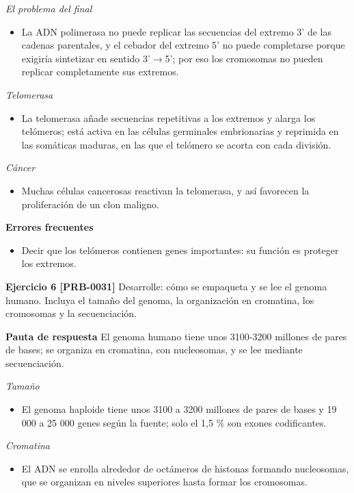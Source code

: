 \documentclass{book}
\begin{document}
\noindent\textit{El problema del final}
\begin{itemize}
\item La ADN polimerasa no puede replicar las secuencias del extremo 3' de las cadenas parentales, y el cebador del extremo 5' no puede completarse porque exigiría sintetizar en sentido 3'\(\to\)5'; por eso los cromosomas no pueden replicar completamente sus extremos.
\end{itemize}

\noindent\textit{Telomerasa}
\begin{itemize}
\item La telomerasa añade secuencias repetitivas a los extremos y alarga los telómeros; está activa en las células germinales embrionarias y reprimida en las somáticas maduras, en las que el telómero se acorta con cada división.
\end{itemize}

\noindent\textit{Cáncer}
\begin{itemize}
\item Muchas células cancerosas reactivan la telomerasa, y así favorecen la proliferación de un clon maligno.
\end{itemize}

\noindent\textbf{Errores frecuentes}
\begin{itemize}
\item Decir que los telómeros contienen genes importantes: su función es proteger los extremos.
\end{itemize}

\noindent\textbf{Ejercicio 6 [PRB-0031]}
Desarrolle: cómo se empaqueta y se lee el genoma humano. Incluya el tamaño del genoma, la organización en cromatina, los cromosomas y la secuenciación.


\noindent\textbf{Pauta de respuesta}
El genoma humano tiene unos 3100-3200 millones de pares de bases; se organiza en cromatina, con nucleosomas, y se lee mediante secuenciación.


\noindent\textit{Tamaño}
\begin{itemize}
\item El genoma haploide tiene unos 3100 a 3200 millones de pares de bases y 19 000 a 25 000 genes según la fuente; solo el 1,5 \% son exones codificantes.
\end{itemize}

\noindent\textit{Cromatina}
\begin{itemize}
\item El ADN se enrolla alrededor de octámeros de histonas formando nucleosomas, que se organizan en niveles superiores hasta formar los cromosomas.
\end{itemize}
\end{document}
